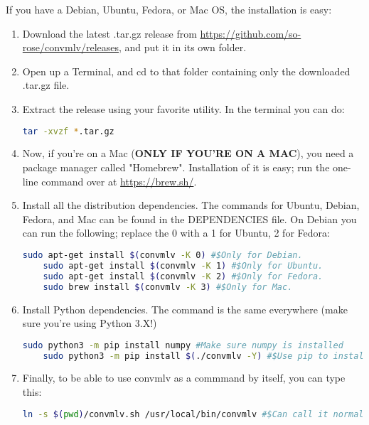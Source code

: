 \documentclass[a4paper,12pt]{article}
\begin{document}
		If you have a Debian, Ubuntu, Fedora, or Mac OS, the installation is easy:

\begin{enumerate}
	\item Download the latest .tar.gz release from \url{https://github.com/so-rose/convmlv/releases}, and put it in its own folder.
	\item Open up a Terminal, and cd to that folder containing only the downloaded .tar.gz file.
	\item Extract the release using your favorite utility. In the terminal you can do:
	
\begin{lstlisting}[language=bash]
	tar -xvzf *.tar.gz
\end{lstlisting}
	
	\item Now, if you're on a Mac (\textbf{ONLY IF YOU'RE ON A MAC}), you need a package manager called "Homebrew". Installation of it is easy;
	run the one-line command over at \url{https://brew.sh/}.
	
	\item Install all the distribution dependencies. The commands for Ubuntu, Debian, Fedora, and Mac can be found in the DEPENDENCIES file.
	On Debian you can run the following; replace the 0 with a 1 for Ubuntu, 2 for Fedora:
	
\begin{lstlisting}[language=bash]
	sudo apt-get install $(convmlv -K 0) #$Only for Debian.
	sudo apt-get install $(convmlv -K 1) #$Only for Ubuntu.
	sudo apt-get install $(convmlv -K 2) #$Only for Fedora.
	sudo brew install $(convmlv -K 3) #$Only for Mac.
\end{lstlisting}

	\item Install Python dependencies. The command is the same everywhere (make sure you're using Python 3.X!)
	
\begin{lstlisting}[language=bash]
	sudo python3 -m pip install numpy #Make sure numpy is installed
	sudo python3 -m pip install $(./convmlv -Y) #$Use pip to install things!
\end{lstlisting}

	\item Finally, to be able to use convmlv as a commmand by itself, you can type this:
	
\begin{lstlisting}[language=bash]
	ln -s $(pwd)/convmlv.sh /usr/local/bin/convmlv #$Can call it normally now.
\end{lstlisting}

\end{enumerate}		
\end{document}
